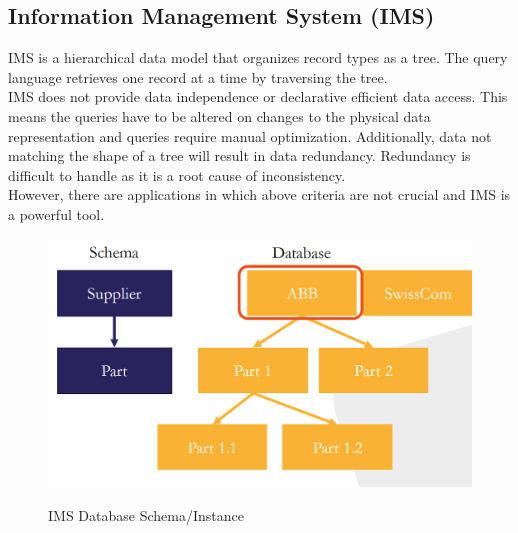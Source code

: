 \subsection{Information Management System (IMS)}
IMS is a hierarchical data model that organizes record types as a tree. The query language retrieves one record at a time by traversing the tree. \\
IMS does not provide data independence or declarative efficient data access. This means the queries have to be altered on changes to the physical data representation and queries require manual optimization. Additionally, data not matching the shape of a tree will result in data redundancy. Redundancy is difficult to handle as it is a root cause of inconsistency.\\
However, there are applications in which above criteria are not crucial and IMS is a powerful tool.
\begin{figure}[H]
\centering
\includegraphics[width=.4\textwidth]{images/IMS.PNG}
\label{IMS_instance}
\caption{IMS Database Schema/Instance}
\end{figure}

